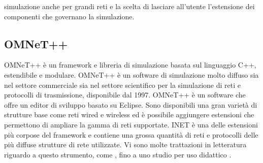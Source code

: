 simulazione anche per grandi reti e la scelta di lasciare all'utente l'estensione dei componenti che governano la simulazione.
\bigskip

\subsection{OMNeT++}
OMNeT++ è un framework e libreria di simulazione basata sul linguaggio C++, estendibile e modulare. OMNeT++ è un software di simulazione molto diffuso sia nel settore commerciale sia nel settore scientifico per la simulazione di reti e protocolli di trasmissione, disponibile dal 1997. OMNeT++ è un software che offre un editor di sviluppo basato su Eclipse. Sono disponibili una gran varietà di strutture base come reti wired e wireless ed è possibile aggiungere estensioni che permettono di ampliare la gamma di reti supportate. INET è una delle estensioni più corpose del framework e contiene una grossa quantità di reti e protocolli delle più diffuse strutture di rete utilizzate. Vi sono molte trattazioni in letteratura riguardo a questo strumento, come \cite{omnet2010-book}, \cite{omnet2002-overview} fino a uno studio per uso didattico \cite{omnet2002-edu}.

